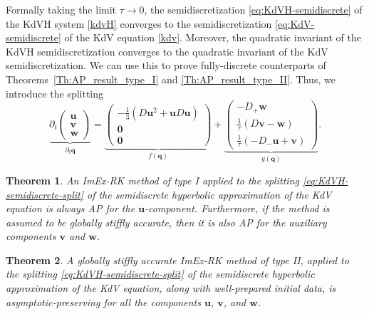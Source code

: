 \documentclass{article}
\newtheorem{thm}{Theorem}
\begin{document}
Formally taking the limit $\tau \to 0$, the semidiscretization
\eqref{eq:KdVH-semidiscrete} of the KdVH system \eqref{kdvH} converges
to the semidiscretization \eqref{eq:KdV-semidiscrete} of the KdV equation
\eqref{kdv}. Moreover, the quadratic invariant of the KdVH semidiscretization
converges to the quadratic invariant of the KdV semidiscretization. We can use this
to prove fully-discrete counterparts of Theorems~\ref{Th:AP_result_type_I} and
\ref{Th:AP_result_type_II}. Thus, we introduce the splitting
\begin{equation}
\label{eq:KdVH-semidiscrete-split}
    \underbrace{\partial_t \begin{pmatrix}
        \pmb{u} \\
        \pmb{v} \\
        \pmb{w}
    \end{pmatrix}}_{\partial_t \pmb{q}}
    =
    \underbrace{\begin{pmatrix}
        -\frac{1}{3} \left( D \pmb{u}^2 + \pmb{u} D \pmb{u} \right) \\
        \pmb{0} \\
        \pmb{0}
    \end{pmatrix}}_{f(\pmb{q})}
    +
    \underbrace{\begin{pmatrix}
        -D_+ \pmb{w} \\
        \frac{1}{\tau} (D \pmb{v} - \pmb{w}) \\
        \frac{1}{\tau} (-D_- \pmb{u} + \pmb{v})
    \end{pmatrix}}_{g(\pmb{q})}.
\end{equation}

\begin{thm}\label{Th:AP_result_type_I_fully_discrete}
    An ImEx-RK method of type I applied to the splitting \eqref{eq:KdVH-semidiscrete-split}
    of the semidiscrete hyperbolic approximation of the KdV equation is always AP for the
    $\pmb{u}$-component. Furthermore, if the method is assumed to be globally stiffly accurate,
    then it is also AP for the auxiliary components $\pmb{v}$ and $\pmb{w}$.
\end{thm}

\begin{thm}\label{Th:AP_result_type_II_fully_discrete}
    A globally stiffly accurate ImEx-RK method of type II, applied to the splitting
    \eqref{eq:KdVH-semidiscrete-split} of the semidiscrete hyperbolic approximation of
    the KdV equation, along with well-prepared initial data, is asymptotic-preserving
    for all the components $\pmb{u}$, $\pmb{v}$, and $\pmb{w}$.
\end{thm}
\end{document}
